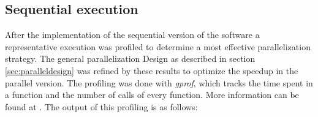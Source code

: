 \subsection{Sequential execution}
\label{sec:seq_ex}
After the implementation of the sequential version of the software a representative execution was profiled to determine a most effective parallelization strategy. The general parallelization Design as described in section \ref{sec:paralleldesign} was refined by these results to optimize the speedup in the parallel version.
The profiling was done with \emph{gprof}, which tracks the time spent in a function and the number of calls of every function. More information can be found at \cite{gprof}.
The output of this profiling is as follows:

